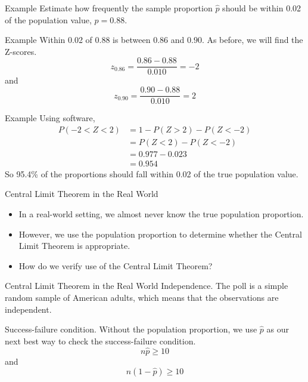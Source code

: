 \begin{frame}{Example}
    Estimate how frequently the sample proportion $\hat{p}$ should be within 0.02 of the population value, $p = 0.88$.
\end{frame}

\begin{frame}{Example}
    Within 0.02 of 0.88 is between $0.86$ and $0.90$. As before, we will find the Z-scores.
    \[
        z_{0.86} = \frac{0.86-0.88}{0.010} = -2
    \]
    and 
    \[
        z_{0.90} = \frac{0.90-0.88}{0.010} = 2
    \]
\end{frame}

\begin{frame}{Example}
    Using software,
    \begin{align*}
        P(-2 < Z < 2) &= 1 - P(Z > 2) - P(Z < -2) \\
        &= P(Z < 2) - P(Z < -2) \\
        &= 0.977 - 0.023 \\
        &= 0.954
    \end{align*}
    So 95.4\% of the proportions should fall within 0.02 of the true population value. 
\end{frame}

\begin{frame}{Central Limit Theorem in the Real World}
    \begin{itemize}
        \item In a real-world setting, we almost never know the true population proportion. 
        \item However, we use the population proportion to determine whether the Central Limit Theorem is appropriate. 
        \item How do we verify use of the Central Limit Theorem?
    \end{itemize}
\end{frame}

\begin{frame}{Central Limit Theorem in the Real World}
    Independence. The poll is a simple random sample of American adults, which means that the observations are independent.

    \vspace{12pt}Success-failure condition. Without the population proportion, we use $\hat{p}$ as our next best way to check the success-failure condition.
    \[
        n\hat{p} \ge 10
    \]
    and
    \[
        n(1-\hat{p}) \ge 10
    \]
\end{frame}


